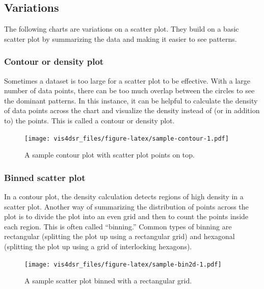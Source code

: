 \documentclass[
]{krantz}
\begin{document}
\hypertarget{variations-1}{%
\subsection{Variations}\label{variations-1}}

The following charts are variations on a scatter plot. They build on a basic
scatter plot by summarizing the data and making it easier to see patterns.

\hypertarget{contour-or-density-plot}{%
\subsubsection{Contour or density plot}\label{contour-or-density-plot}}

Sometimes a dataset is too large for a scatter plot to be effective. With a large
number of data points, there can be too much overlap between the circles to see
the dominant patterns. In this instance, it can be helpful to calculate the density
of data points across the chart and visualize the density instead of (or in addition to)
the points. This is called a contour or density plot.

\begin{figure}
\centering
\texttt{[image: vis4dsr\_files/figure-latex/sample-contour-1.pdf]}
\caption{\label{fig:sample-contour}A sample contour plot with scatter plot points on top.}
\end{figure}

\hypertarget{binned-scatter-plot}{%
\subsubsection{Binned scatter plot}\label{binned-scatter-plot}}

In a contour plot, the density calculation detects regions of high density in a
scatter plot. Another way of summarizing the distribution of points across the plot
is to divide the plot into an even grid and then to count the points inside each
region. This is often called ``binning.'' Common types of binning are rectangular
(splitting the plot up using a rectangular grid) and hexagonal (splitting the
plot up using a grid of interlocking hexagons).

\begin{figure}
\centering
\texttt{[image: vis4dsr\_files/figure-latex/sample-bin2d-1.pdf]}
\caption{\label{fig:sample-bin2d}A sample scatter plot binned with a rectangular grid.}
\end{figure}
\end{document}
